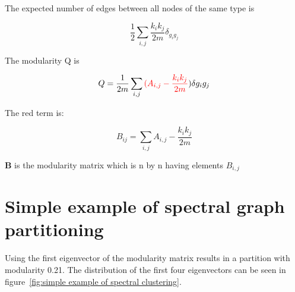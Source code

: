 The expected number of edges between all nodes of the same type is 

\begin{equation}
    \frac{1}{2}\sum_{i,j} \frac{k_i k_j}{2m}\delta_{g_i g_j}
\end{equation}

The modularity Q is 

\begin{equation}
    Q=\frac{1}{2m}\sum_{i,j}\textcolor{red}{(A_{i,j}-\frac{k_i k_j}{2m}}) \delta{g_i g_j}
\end{equation}

The red term is:

\begin{equation}
    B_{ij} = \sum_{i,j} A_{i,j} - \frac{k_i k_j}{2m}
\end{equation}

$\mathbf{B}$ is the modularity matrix which is n by n having elements $B_{i,j}$

\section{Simple example of spectral graph partitioning}
\label{sec:simple example of spectral graph partitioning}

Using the first eigenvector of the modularity matrix results in a partition with modularity 0.21. The distribution of the first four eigenvectors can be seen in figure~\ref{fig:simple example of spectral clustering}.

